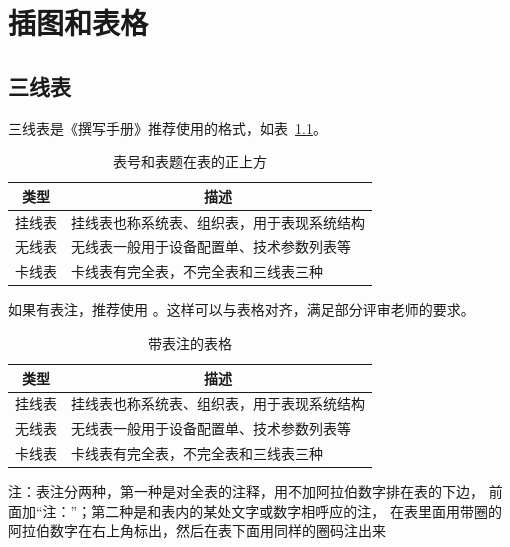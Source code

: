 
\chapter{插图和表格}

\section{三线表}

三线表是《撰写手册》推荐使用的格式，如表~\ref{tab:exampletable}。

\begin{table}
  \centering
  \caption{表号和表题在表的正上方}
  \label{tab:exampletable}
  \begin{tabular}{cl}
    \toprule
    类型   & \multicolumn{1}{c}{描述}               \\
    \midrule
    挂线表 & 挂线表也称系统表、组织表，用于表现系统结构 \\
    无线表 & 无线表一般用于设备配置单、技术参数列表等   \\
    卡线表 & 卡线表有完全表，不完全表和三线表三种       \\
    \bottomrule
  \end{tabular}
\end{table}


如果有表注，推荐使用 。这样可以与表格对齐，满足部分评审老师的要求。

\begin{table}
  \centering
  \begin{threeparttable}
    \caption{带表注的表格}
    \label{tab:tablewithnotes}
    \begin{tabular}{cl}
      \toprule
      类型   & \multicolumn{1}{c}{描述}              \\
      \midrule
      挂线表 & 挂线表也称系统表、组织表，用于表现系统结构 \\
      无线表 & 无线表一般用于设备配置单、技术参数列表等   \\
      卡线表 & 卡线表有完全表，不完全表和三线表三种       \\
      \bottomrule
    \end{tabular}
    \begin{tablenotes}[flushleft]
      \item 注：表注分两种，第一种是对全表的注释，用不加阿拉伯数字排在表的下边，
      前面加“注：”；第二种是和表内的某处文字或数字相呼应的注，
      在表里面用带圈的阿拉伯数字在右上角标出，然后在表下面用同样的圈码注出来
    \end{tablenotes}
  \end{threeparttable}
\end{table}


